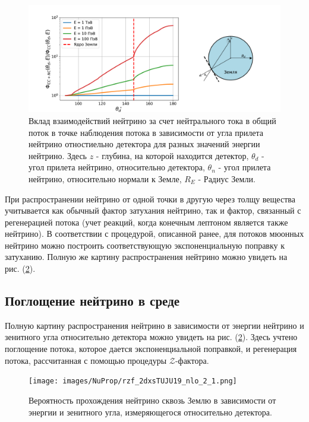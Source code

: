 \begin{figure}[!h]
\centering
\includegraphics[width=1.1\linewidth]{images/NuProp/rhh12zf_flux_index_CT18ZNNLO.pdf}
\caption{Вклад взаимодействий нейтрино за счет нейтрального тока в общий поток в точке наблюдения потока в зависимости от угла прилета нейтрино отностиельно детектора для разных значений энергии нейтрино. Здесь $z$ - глубина, на которой находится детектор, $\theta_d$ - угол прилета нейтрино, относительно детектора, $\theta_n$ - угол прилета нейтрино, относительно нормали к Земле, $R_E$ - Радиус Земли.}
\label{EF1}
\end{figure}
При распространении нейтрино от одной точки в другую через толщу вещества учитывается как обычный фактор затухания нейтрино, так и фактор, связанный с регенерацией потока (учет реакций, когда конечным лептоном является также нейтрино). В соответствии с процедурой, описанной ранее, для потоков мюонных нейтрино можно построить соответствующую экспоненциальную поправку к затуханию. Полную же картину распространения нейтрино можно увидеть на рис. (\ref{EF2}).
\subsection{Поглощение нейтрино в среде }
 Полную картину распространения нейтрино в зависимости от энергии нейтрино и зенитного угла относительно детектора  можно увидеть на рис. (\ref{EF2}). Здесь учтено поглощение потока, которое дается экспоненциальной поправкой, и регенерация потока, рассчитанная с помощью процедуры $\mathcal{Z}$-фактора.
 \begin{figure}[!h]
\centering
\texttt{[image: images/NuProp/rzf\_2dxsTUJU19\_nlo\_2\_1.png]}
\caption{Вероятность прохождения нейтрино сквозь Землю в зависимости от энергии и зенитного угла, измеряющегося относительно детектора.}
\label{EF2}
\end{figure}
